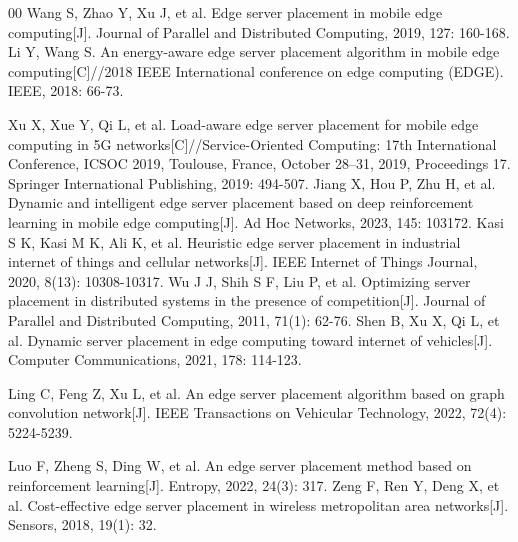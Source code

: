 \documentclass[10pt, conference, letterpaper]{IEEEtran}
\begin{document}

\begin{thebibliography}{00}
 Wang S, Zhao Y, Xu J, et al. Edge server placement in mobile edge computing[J]. Journal of Parallel and Distributed Computing, 2019, 127: 160-168.
 Li Y, Wang S. An energy-aware edge server placement algorithm in mobile edge computing[C]//2018 IEEE International conference on edge computing (EDGE). IEEE, 2018: 66-73.

 Xu X, Xue Y, Qi L, et al. Load-aware edge server placement for mobile edge computing in 5G networks[C]//Service-Oriented Computing: 17th International Conference, ICSOC 2019, Toulouse, France, October 28–31, 2019, Proceedings 17. Springer International Publishing, 2019: 494-507.
 Jiang X, Hou P, Zhu H, et al. Dynamic and intelligent edge server placement based on deep reinforcement learning in mobile edge computing[J]. Ad Hoc Networks, 2023, 145: 103172.
 Kasi S K, Kasi M K, Ali K, et al. Heuristic edge server placement in industrial internet of things and cellular networks[J]. IEEE Internet of Things Journal, 2020, 8(13): 10308-10317.
 Wu J J, Shih S F, Liu P, et al. Optimizing server placement in distributed systems in the presence of competition[J]. Journal of Parallel and Distributed Computing, 2011, 71(1): 62-76.
 Shen B, Xu X, Qi L, et al. Dynamic server placement in edge computing toward internet of vehicles[J]. Computer Communications, 2021, 178: 114-123.

 Ling C, Feng Z, Xu L, et al. An edge server placement algorithm based on graph convolution network[J]. IEEE Transactions on Vehicular Technology, 2022, 72(4): 5224-5239.

 Luo F, Zheng S, Ding W, et al. An edge server placement method based on reinforcement learning[J]. Entropy, 2022, 24(3): 317.
 Zeng F, Ren Y, Deng X, et al. Cost-effective edge server placement in wireless metropolitan area networks[J]. Sensors, 2018, 19(1): 32.


\end{thebibliography}
\end{document}
